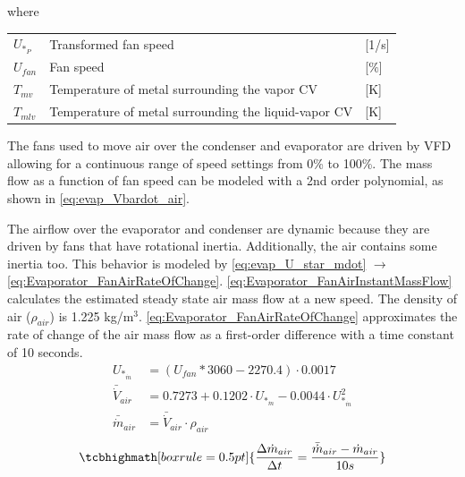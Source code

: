 where
\smallskip
\begin{center}
	\begin{tabular}{l p{10cm} l}
		$U_{*_P}$       & Transformed fan speed                                & [1/\si{s}]                        \\
		$U_{fan}$       & Fan speed                                            & [$\%$]                        \\
		$T_{mv}$        & Temperature of metal surrounding the vapor CV        & [\si{K}]                          \\
		$T_{mlv}$       & Temperature of metal surrounding the liquid-vapor CV & [\si{K}]
	\end{tabular}
\end{center}

\medskip
The fans used to move air over the condenser and evaporator are driven by VFD allowing for a continuous range of speed settings from 0\% to 100\%. The mass flow as a function of fan speed can be modeled with a 2nd order polynomial, as shown in \cref{eq:evap_Vbardot_air}.

The airflow over the evaporator and condenser are dynamic because they are driven by fans that have rotational inertia. Additionally, the air contains some inertia too. This behavior is modeled by \cref{eq:evap_U_star_mdot} $\rightarrow$ \cref{eq:Evaporator_FanAirRateOfChange}. \cref{eq:Evaporator_FanAirInstantMassFlow} calculates the estimated steady state air mass flow at a new speed. The density of air ($\rho_{air}$) is 1.225 \si{kg}/\si{m}$^3$. \cref{eq:Evaporator_FanAirRateOfChange} approximates the rate of change of the air mass flow as a first-order difference with a time constant of 10 seconds.
\begin{align}
	U_{*_{\dot{m}}} & = (U_{fan}*3060 - 2270.4)\cdot 0.0017 \label{eq:evap_U_star_mdot}\\
	\bar{\dot{V}}_{air} & = 0.7273 + 0.1202 \cdot 	U_{*_{\dot{m}}}  -0.0044 \cdot 	U_{*_{\dot{m}}}^2	\label{eq:evap_Vbardot_air} \\
	\bar{\dot{m}}_{air} & = \bar{\dot{V}}_{air} \cdot \rho_{air}	\label{eq:Evaporator_FanAirInstantMassFlow}
\end{align}
\begin{equation}
	\tcbhighmath[boxrule = 0.5pt]{ 	\frac{\Delta \dot{m}_{air}}{\Delta t} = \frac{\bar{\dot{m}}_{air}  - \dot{m}_{air}}{10s}  }  \label{eq:Evaporator_FanAirRateOfChange}
\end{equation}


